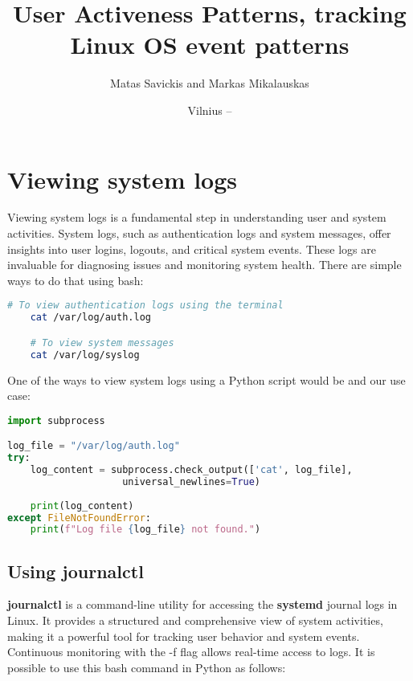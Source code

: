 \documentclass{VUMIFPSmagistrinis}
\title{User Activeness Patterns, tracking Linux OS event patterns}
\author{Matas Savickis and Markas Mikalauskas}
\date{Vilnius – \the\year}
\begin{document}

\maketitle

\tableofcontents





\section{Viewing system logs}
Viewing system logs is a fundamental step in understanding user and system activities. System logs, such as authentication logs and system messages, offer insights into user logins, logouts, and critical system events. These logs are invaluable for diagnosing issues and monitoring system health. There are simple ways to do that using bash:

\begin{lstlisting}[language=bash]
    # To view authentication logs using the terminal
    cat /var/log/auth.log 

    # To view system messages
    cat /var/log/syslog
\end{lstlisting}

\noindent One of the ways to view system logs using a Python script would be and our use case:
\begin{lstlisting}[language=Python]
import subprocess

log_file = "/var/log/auth.log"
try:
    log_content = subprocess.check_output(['cat', log_file], 
                    universal_newlines=True)
    
    print(log_content)
except FileNotFoundError:
    print(f"Log file {log_file} not found.")
\end{lstlisting}

\subsection{Using journalctl}
\textbf{journalctl} is a command-line utility for accessing the \textbf{systemd} journal logs in Linux. It provides a structured and comprehensive view of system activities, making it a powerful tool for tracking user behavior and system events. Continuous monitoring with the -f flag allows real-time access to logs. It is possible to use this bash command in Python as follows:
\end{document}
